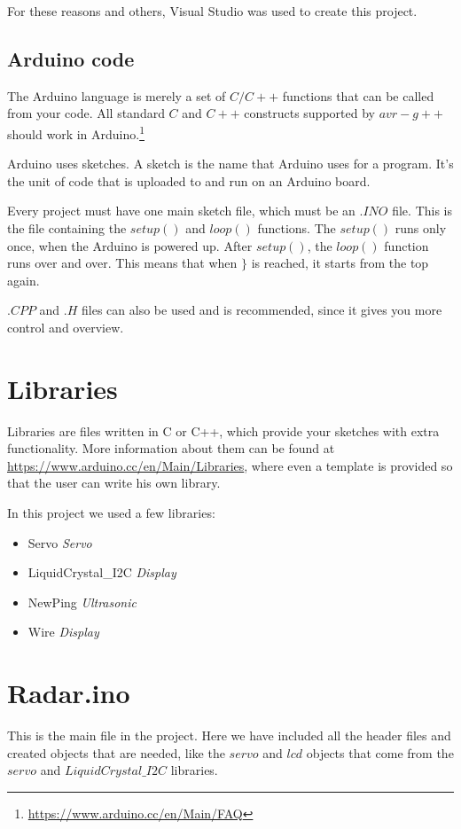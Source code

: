 For these reasons and others, Visual Studio was used to create this project.

\subsection{Arduino code}
The Arduino language is merely a set of $C/C++$ functions that can be called from your code. All standard $C$ and $C++$ constructs supported by $avr-g++$ should work in Arduino.\footnote{\url{https://www.arduino.cc/en/Main/FAQ}}

Arduino uses sketches. A sketch is the name that Arduino uses for a program. It's the unit of code that is uploaded to and run on an Arduino board.

Every project must have one main sketch file, which must be an $.INO$ file. This is the file containing the $setup()$ and $loop()$ functions. The $setup()$ runs only once, when the Arduino is powered up. After $setup()$, the $loop()$ function runs  over and over. This means that when $\}$ is reached, it starts from the top again.

$.CPP$ and $.H$ files can also be used and is recommended, since it gives you more control and overview.

\newpage

\section{Libraries}
Libraries are files written in C or C++, which provide your sketches with extra functionality. More information about them can be found at \url{https://www.arduino.cc/en/Main/Libraries}, where even a template is provided so that the user can write his own library.

In this project we used a few libraries:
\begin{multicols}{2}
\begin{itemize}
	\item Servo \textit{Servo}
	\item LiquidCrystal\_I2C \textit{Display}
	\item NewPing \textit{Ultrasonic}	
	\item Wire \textit{Display}	
\end{itemize}
\end{multicols}

\section{Radar.ino}
This is the main file in the project. Here we have included all the header files and created objects that are needed, like the $servo$ and $lcd$ objects that come from the $servo$ and $LiquidCrystal\_I2C$ libraries.

